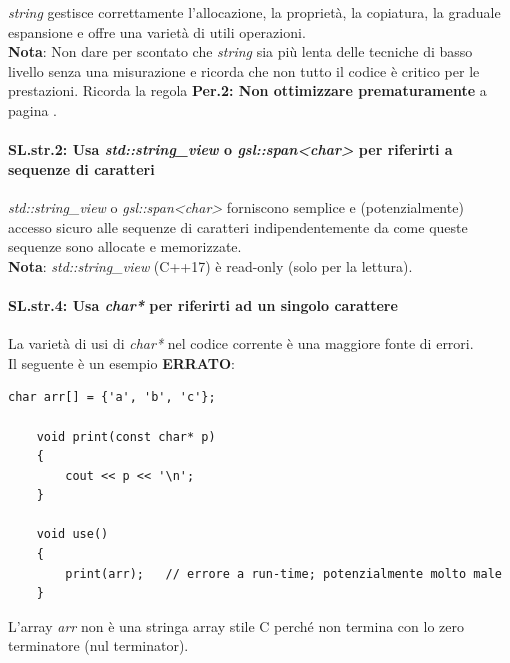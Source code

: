 \textsf{\small \emph{string} gestisce correttamente l'allocazione, la proprietà, la copiatura, la graduale espansione e offre una varietà di utili operazioni.} \\

\textsf{\small \textbf{Nota}: Non dare per scontato che \emph{string} sia più lenta delle tecniche di basso livello senza una misurazione e ricorda che non tutto il codice è critico per le prestazioni. Ricorda la regola \textbf{Per.2: Non ottimizzare prematuramente} a pagina \pageref{Per_2}.} \\

\paragraph{SL.str.2: Usa \emph{std::string\_view} o \emph{gsl::span<char>} per riferirti a sequenze di caratteri}

\textsf{\small \emph{std::string\_view} o \emph{gsl::span<char>} forniscono semplice e (potenzialmente) accesso sicuro alle sequenze di caratteri indipendentemente da come queste sequenze sono allocate e memorizzate. } \\

\textsf{\small \textbf{Nota}: \emph{std::string\_view} (C++17) è read-only (solo per la lettura).} \\

\paragraph{SL.str.4: Usa \emph{char*} per riferirti ad un singolo carattere}

\textsf{\small La varietà di usi di \emph{char*} nel codice corrente è una maggiore fonte di errori.} \\

\textsf{\small Il seguente è un esempio \textbf{\color{red}ERRATO}\normalcolor:}

\begin{lstlisting}[frame=single, rulecolor=\color{red}]
	char arr[] = {'a', 'b', 'c'};
	
	void print(const char* p)
	{
		cout << p << '\n';
	}
	
	void use()
	{
		print(arr);   // errore a run-time; potenzialmente molto male
	}
\end{lstlisting}

\textsf{\small L'array \emph{arr} non è una stringa array stile C perché non termina con lo zero terminatore (nul terminator).} \\

